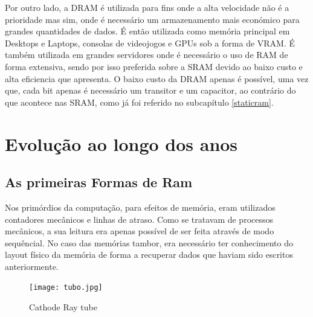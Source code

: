 \documentclass{report}
\begin{document}
\par Por outro lado, a \ac{DRAM} é utilizada para fins onde a alta velocidade não é a prioridade mas sim, onde é necessário um armazenamento mais económico para grandes quantidades de dados. É então utilizada como memória principal em Desktops e Laptops, consolas de videojogos e \ac{GPU}s sob a forma de \ac{VRAM}. É também utilizada em grandes servidores onde é necessário o uso de \ac{RAM} de forma extensiva, sendo por isso preferida sobre a \ac{SRAM} devido ao baixo custo e alta eficiencia que apresenta. O baixo custo da \ac{DRAM} apenas é possível, uma vez que, cada bit apenas é necessário um transitor e um capacitor, ao contrário do que acontece nas \ac{SRAM}, como já foi referido no subcapítulo \ref{staticram}.
\label{chap.aplicacoes}




\chapter{Evolução ao longo dos anos}
\label{chap.evolução}
\section{As primeiras Formas de Ram}
\label{Primeira ram}

\par Nos primórdios da computação, para efeitos de memória, eram utilizados contadores mecânicos e linhas de atraso. Como se tratavam de processos mecânicos, a sua leitura era apenas possível de ser feita através de modo sequêncial. No caso das memórias tambor, era necessário ter conhecimento do layout físico da memória de forma a recuperar dados que haviam sido escritos anteriormente.

\begin{figure}[b]
\texttt{[image: tubo.jpg]}
\caption{Cathode Ray tube}
\label{crt}
\end{figure}
\end{document}
